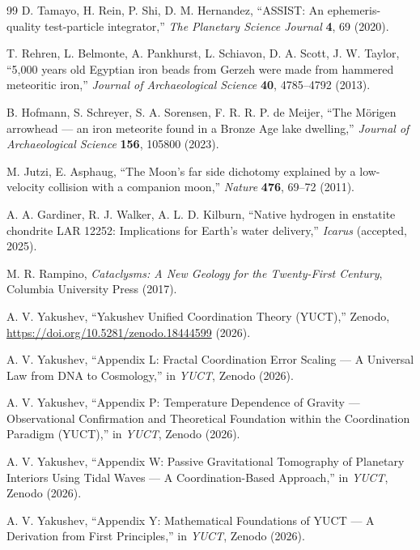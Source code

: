 \documentclass[11pt,a4paper]{article}
\begin{document}
\begin{thebibliography}{99}
		D. Tamayo, H. Rein, P. Shi, D. M. Hernandez, ``ASSIST: An ephemeris-quality test-particle integrator,''
		\emph{The Planetary Science Journal} \textbf{4}, 69 (2020).
		
		T. Rehren, L. Belmonte, A. Pankhurst, L. Schiavon, D. A. Scott, J. W. Taylor, ``5,000 years old Egyptian iron beads from Gerzeh were made from hammered meteoritic iron,''
		\emph{Journal of Archaeological Science} \textbf{40}, 4785–4792 (2013).
		
		B. Hofmann, S. Schreyer, S. A. Sorensen, F. R. R. P. de Meijer, ``The Mörigen arrowhead — an iron meteorite found in a Bronze Age lake dwelling,''
		\emph{Journal of Archaeological Science} \textbf{156}, 105800 (2023).
		
		M. Jutzi, E. Asphaug, ``The Moon's far side dichotomy explained by a low-velocity collision with a companion moon,''
		\emph{Nature} \textbf{476}, 69–72 (2011).
		
		A. A. Gardiner, R. J. Walker, A. L. D. Kilburn, ``Native hydrogen in enstatite chondrite LAR 12252: Implications for Earth's water delivery,''
		\emph{Icarus} (accepted, 2025).
		
		M. R. Rampino, \emph{Cataclysms: A New Geology for the Twenty-First Century},
		Columbia University Press (2017).
		
		A. V. Yakushev, ``Yakushev Unified Coordination Theory (YUCT),''
		Zenodo, \url{https://doi.org/10.5281/zenodo.18444599} (2026).
		
		A. V. Yakushev, ``Appendix L: Fractal Coordination Error Scaling — A Universal Law from DNA to Cosmology,''
		in \emph{YUCT}, Zenodo (2026).
		
		A. V. Yakushev, ``Appendix P: Temperature Dependence of Gravity — Observational Confirmation and Theoretical Foundation within the Coordination Paradigm (YUCT),''
		in \emph{YUCT}, Zenodo (2026).
		
		A. V. Yakushev, ``Appendix W: Passive Gravitational Tomography of Planetary Interiors Using Tidal Waves — A Coordination-Based Approach,''
		in \emph{YUCT}, Zenodo (2026).
		
		A. V. Yakushev, ``Appendix Y: Mathematical Foundations of YUCT — A Derivation from First Principles,''
		in \emph{YUCT}, Zenodo (2026).
		

\end{thebibliography}
\end{document}
